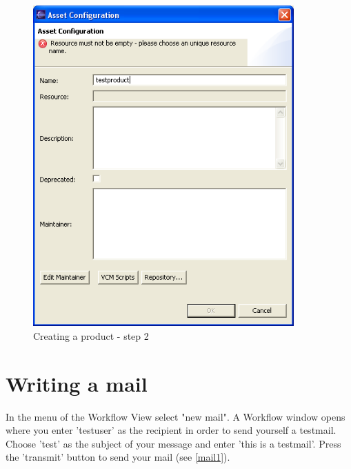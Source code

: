 \begin{figure}[h!]
\begin{center}
\includegraphics[width=10cm]{tutorial15.png}
   \caption{Creating a product - step 2}
   \label{product2}
\end{center}
\end{figure}\par





\section{Writing a mail}

In the menu of the Workflow View select "new mail". A Workflow window opens where
you enter 'testuser' as the recipient in order to send yourself a testmail. 
Choose 'test' as the subject of your message and enter 'this is a testmail'. 
Press the 'transmit' button to send your mail (see \ref{mail1}).

